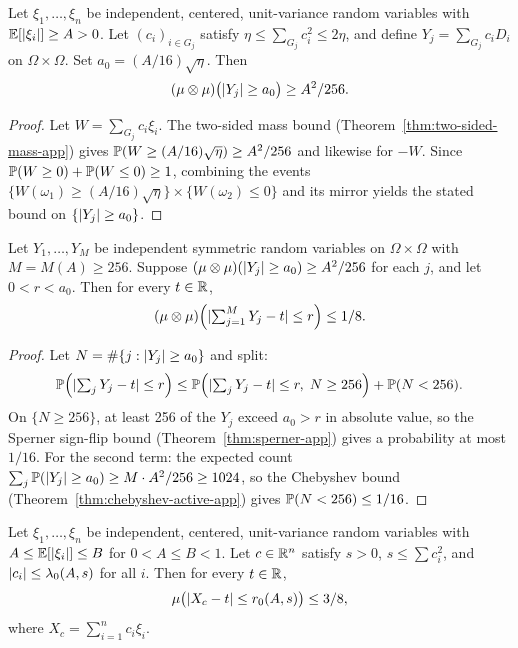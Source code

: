 \begin{lemma}\label{lem:block-mass}
Let $\xi_1, \dots, \xi_n$ be independent, centered, unit-variance
random variables with $\mathbb{E}[\lvert \xi_i \rvert] \ge A > 0$. Let
$(c_i)_{i \in G_j}$ satisfy
$\eta \le \sum_{G_j} c_i^2 \le 2\eta$, and define
$Y_j = \sum_{G_j} c_i D_i$ on $\Omega \times \Omega$.
Set $a_0 = (A/16)\sqrt{\eta}$. Then
\[
(\mu \otimes \mu)\bigl(\lvert Y_j \rvert \ge a_0\bigr)
\ge A^2/256.
\]
\end{lemma}

\begin{proof}
Let $W = \sum_{G_j} c_i \xi_i$. The two-sided mass bound
(Theorem~\ref{thm:two-sided-mass-app}) gives
$\mathbb{P}(W \ge (A/16)\sqrt{\eta}) \ge A^2/256$ and likewise for $-W$.
Since $\mathbb{P}(W \ge 0) + \mathbb{P}(W \le 0) \ge 1$, combining the events
$\{W(\omega_1) \ge (A/16)\sqrt{\eta}\} \times \{W(\omega_2) \le 0\}$
and its mirror yields the stated bound on
$\{\lvert Y_j \rvert \ge a_0\}$.
\end{proof}

\begin{lemma}\label{lem:block-smallball}
Let $Y_1, \dots, Y_M$ be independent symmetric random variables on
$\Omega \times \Omega$ with $M = M(A) \ge 256$. Suppose
$(\mu \otimes \mu)(\lvert Y_j \rvert \ge a_0) \ge A^2/256$ for each $j$,
and let $0 < r < a_0$. Then for every $t \in \mathbb{R}$,
\[
(\mu \otimes \mu)
\Bigl(\lvert \textstyle\sum_{j=1}^{M} Y_j - t \rvert
\le r\Bigr)
\le 1/8.
\]
\end{lemma}

\begin{proof}
Let $N = \#\{j : \lvert Y_j \rvert \ge a_0\}$ and split:
\[
\mathbb{P}\Bigl(\lvert \textstyle\sum_j Y_j - t \rvert
\le r\Bigr)
\le
\mathbb{P}\Bigl(\lvert \textstyle\sum_j Y_j - t \rvert
\le r,\; N \ge 256\Bigr)
+ \mathbb{P}(N < 256).
\]
On $\{N \ge 256\}$, at least 256 of the $Y_j$ exceed $a_0 > r$ in
absolute value, so the Sperner sign-flip bound
(Theorem~\ref{thm:sperner-app}) gives a probability at most $1/16$.
For the second term: the expected count
$\sum_j \mathbb{P}(\lvert Y_j \rvert \ge a_0) \ge M \cdot A^2/256 \ge 1024$,
so the Chebyshev bound (Theorem~\ref{thm:chebyshev-active-app}) gives
$\mathbb{P}(N < 256) \le 1/16$.
\end{proof}

\begin{proposition}\label{prop:symm-conc}
Let $\xi_1, \dots, \xi_n$ be independent, centered, unit-variance
random variables with $A \le \mathbb{E}[\lvert \xi_i \rvert] \le B$ for
$0 < A \le B < 1$. Let $c \in \mathbb{R}^n$ satisfy $s > 0$,
$s \le \sum c_i^2$, and $\lvert c_i \rvert \le \lambda_0(A,s)$ for all $i$.
Then for every $t \in \mathbb{R}$,
\[
\mu\bigl(\lvert X_c - t \rvert \le r_0(A,s)\bigr) \le 3/8,
\]
where $X_c = \sum_{i=1}^n c_i \xi_i$.
\end{proposition}

